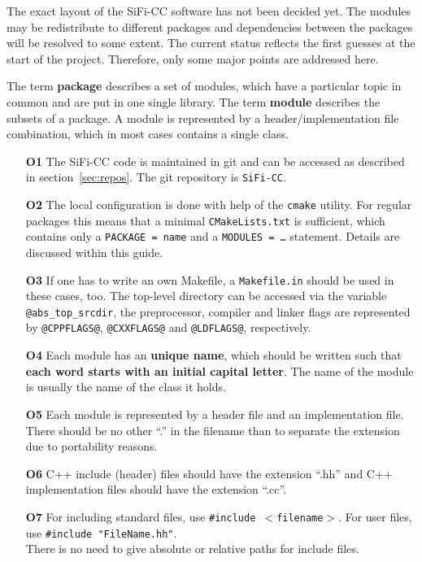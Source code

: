 \documentclass[a4paper,10pt]{article}
\newcommand{\sificc}{SiFi-CC\xspace}
\begin{document}
The exact layout of the \sificc software has not been decided yet. The
modules may be redistribute to different packages and dependencies
between the packages will be resolved to some extent. The current
status reflects the first guesses at the start of the project.
Therefore, only some major points are addressed here.

The term {\bf package} describes a set of modules, which have a
particular topic in common and are put in one single library.
The term {\bf module} describes the subsets of a package. A
module is represented by a header/implementation file combination,
which in most cases contains a single class.

\begin{itemize}
\item[\bf O1]
  The \sificc code is maintained in git and can be accessed as described in
  section~\ref{sec:repos}. The git repository is {\tt \sificc}.
\item[\bf O2]
  The local configuration is done with help of the {\tt cmake} utility.
  For regular packages this means that a minimal {\tt CMakeLists.txt}
  is sufficient, which contains only a {\tt PACKAGE = name} and a
  {\tt MODULES = \dots} statement. Details are discussed within this
  guide.
\item[\bf O3]
  If one has to write an own Makefile, a {\tt Makefile.in} should be
  used in these cases, too. The top-level directory can be accessed
  via the variable {\tt @abs\_top\_srcdir}, the preprocessor, compiler
  and linker flags are represented by {\tt @CPPFLAGS@}, {\tt @CXXFLAGS@}
  and {\tt @LDFLAGS@},
  respectively.
\item[\bf O4]
  Each module has an {\bf unique name}, which should be written
  such that {\bf each word starts with an initial capital letter}. The name
  of the module is usually the name of the class it holds.
\item[\bf O5]
  Each module is represented by a header file and an implementation
  file. There should be no other ``.'' in the filename than to separate the
  extension due to portability reasons.
\item[\bf O6]
  C++ include (header) files should have the extension ``.hh'' and
  C++ implementation files should have the extension ``.cc''.
\item[\bf O7]
  For including standard files, use {\tt \#include $<$filename$>$}.
  For user files, use {\tt \#include "FileName.hh"}.\\
  There is no need to give absolute or relative paths for include files.
\end{itemize}
\end{document}
